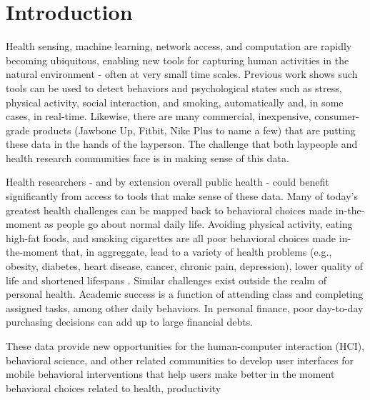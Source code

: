 
\section{Introduction} %




Health sensing, machine learning, network access, and computation are rapidly becoming ubiquitous, enabling new tools for capturing human activities in the natural environment - often at very small time scales.  
Previous work shows such tools can be used to detect behaviors and psychological states such as stress\cite{chang2011,lu2012}, physical activity\cite{li2010,emken2012}, social interaction\cite{wyatt2011}, and smoking\cite{sazonov2011}, automatically and, in some cases, in real-time. Likewise, there are many commercial, inexpensive, consumer-grade products (Jawbone Up, Fitbit, Nike Plus to name a few) that are putting these data in the hands of the layperson. The challenge that both laypeople and health research communities face is in making sense of this data.

Health researchers - and by extension overall public health - could benefit significantly from access to tools that make sense of these data.    Many of today's greatest health challenges can be mapped back to  behavioral choices made in-the-moment as people go about normal daily life.  Avoiding physical activity, eating high-fat foods, and smoking cigarettes are all poor behavioral choices made in-the-moment that, in aggreggate, lead to a variety of health problems (e.g., obesity, diabetes, heart disease, cancer, chronic pain, depression), lower quality of life and shortened lifespans \cite{franco2005, dunn2001, yanbaeva2007, ross2000}. 
Similar challenges exist outside the realm of personal health.
Academic success is a function of attending class and completing assigned tasks, among other daily behaviors\cite{cooper2006}.
In personal finance, poor day-to-day purchasing decisions can add up to large financial debts\cite{norvilitis2003}.

These data provide new opportunities for the human-computer interaction (HCI), behavioral science, and other related communities to develop user interfaces for mobile behavioral interventions that help users make better in the moment behavioral choices related to health\cite{klasnja2012,nahum2012}, productivity\cite{ho2005,sohn2005,jewell2011}

